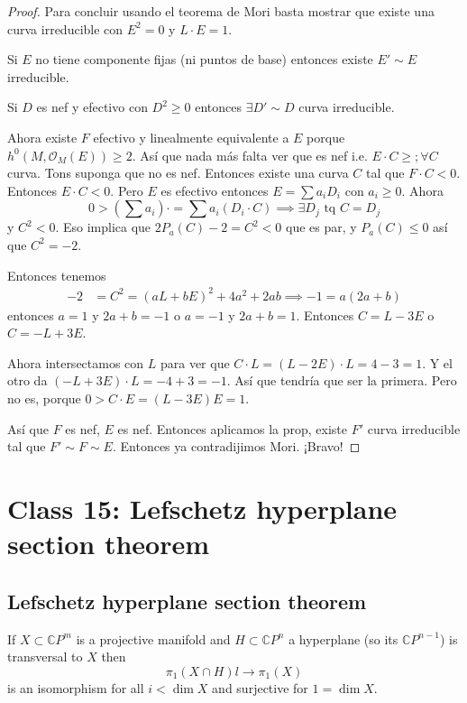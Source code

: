 \begin{proof}
Para concluir usando el teorema de Mori basta mostrar que existe una curva irreducible con $E^2=0$ y $L\cdot E=1$.

\begin{prop}\leavevmode
	Si $E$ no tiene componente fijas (ni puntos de base) entonces existe  $E'\sim E$ irreducible.
\end{prop}

\begin{prop}\leavevmode
	Si  $D$ es nef y efectivo con $D^2\geq 0$ entonces $\exists D'\sim D$ curva irreducible.
\end{prop}
Ahora existe $F$ efectivo y linealmente equivalente a $E$ porque  $h^0(M,\mathcal{O}_M(E))\geq 2$. Así que nada más falta ver que es nef i.e. $E\cdot C\geq; \forall C$ curva. Tons suponga que no es nef. Entonces existe una curva $C$ tal que $F\cdot C<0$. Entonces $E\cdot C<0$. Pero $E$ es efectivo entonces  $E=\sum a_iD_i$ con $a_i\geq 0$. Ahora
\[0>\left(\sum a_i\right)\cdot =\sum a_i(D_i\cdot C)\implies \exists D_{j}\text{ tq }C=D_j \]
y $C^2<0$. Eso implica que $2P_a(C)-2=C^2<0$ que es par,  y $P_a(C)\leq 0$ así que $C^2=-2$.

Entonces tenemos
\begin{align*}
	-2&=C^2=(aL+bE)^2+4a^2+2ab\implies -1=a(2a+b)
\end{align*}
entonces $a=1$ y  $2a+b=-1$ o  $a=-1$ y  $2a+b=1$. Entonces  $C=L-3E$ o  $C=-L+3E$.

Ahora intersectamos con  $L$ para ver que  $C \cdot L=(L-2E)\cdot L=4-3=1$. Y el otro da $(-L+3E)\cdot L=-4+3=-1$. Así que tendría que ser la primera. Pero no es, porque $ 0>C\cdot E=(L-3E)E=1$.

Así que $F$ es nef, $E$ es nef. Entonces aplicamos la prop, existe $F'$ curva irreducible tal que  $F'\sim F\sim E$. Entonces ya contradijimos Mori. ¡Bravo!

\end{proof}

\section{Class 15: Lefschetz hyperplane section theorem}

\subsection{Lefschetz hyperplane section theorem}

\begin{thm}\leavevmode
	If $X\subset \mathbb{C}P^{m}$ is a projective manifold and $H\subset \mathbb{C}P^{n}$ a hyperplane (so its $\mathbb{C}P^{n-1}$) is transversal to $X$ then
	\[\pi_{1}(X\cap H) l\to \pi_{1}(X)\]
	is an isomorphism for all $i<\dim X$ and surjective for $1=\dim X$.
\end{thm}

